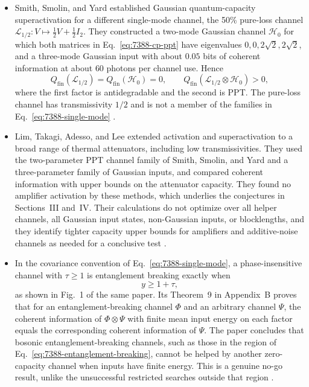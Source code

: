 \begin{itemize}
  \item Smith, Smolin, and Yard established Gaussian quantum-capacity superactivation for a different single-mode channel, the 50\% pure-loss channel $\mathcal L_{1/2}:V\mapsto\frac12V+\frac12I_2$. They constructed a two-mode Gaussian channel $\mathcal H_0$ for which both matrices in Eq.~\eqref{eq:7388-cp-ppt} have eigenvalues $0,0,2\sqrt2,2\sqrt2$, and a three-mode Gaussian input with about $0.05$ bits of coherent information at about $60$ photons per channel use. Hence
\begin{equation}
 Q_{\mathrm{fin}}(\mathcal L_{1/2})=Q_{\mathrm{fin}}(\mathcal H_0)=0,
 \qquad
 Q_{\mathrm{fin}}(\mathcal L_{1/2}\otimes\mathcal H_0)>0,
 \label{eq:7388-loss-superactivation}
\end{equation}
where the first factor is antidegradable and the second is PPT. The pure-loss channel has transmissivity $1/2$ and is not a member of the families in Eq.~\eqref{eq:7388-single-mode} .

  \item Lim, Takagi, Adesso, and Lee extended activation and superactivation to a broad range of thermal attenuators, including low transmissivities. They used the two-parameter PPT channel family of Smith, Smolin, and Yard and a three-parameter family of Gaussian inputs, and compared coherent information with upper bounds on the attenuator capacity. They found no amplifier activation by these methods, which underlies the conjectures in Sections~III and~IV. Their calculations do not optimize over all helper channels, all Gaussian input states, non-Gaussian inputs, or blocklengths, and they identify tighter capacity upper bounds for amplifiers and additive-noise channels as needed for a conclusive test .

  \item In the covariance convention of Eq.~\eqref{eq:7388-single-mode}, a phase-insensitive channel with $\tau\geq1$ is entanglement breaking exactly when
\begin{equation}
 y\geq1+\tau,
 \label{eq:7388-entanglement-breaking}
\end{equation}
as shown in Fig.~1 of the same paper. Its Theorem~9 in Appendix~B proves that for an entanglement-breaking channel $\Phi$ and an arbitrary channel $\Psi$, the coherent information of $\Phi\otimes\Psi$ with finite mean input energy on each factor equals the corresponding coherent information of $\Psi$. The paper concludes that bosonic entanglement-breaking channels, such as those in the region of Eq.~\eqref{eq:7388-entanglement-breaking}, cannot be helped by another zero-capacity channel when inputs have finite energy. This is a genuine no-go result, unlike the unsuccessful restricted searches outside that region .
\end{itemize}

